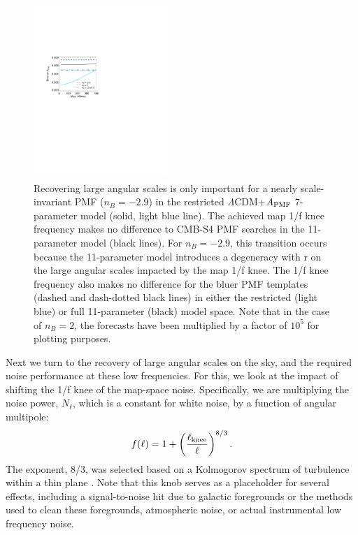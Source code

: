 \documentclass[apj]{emulateapj}
\newcommand{\apmf}{\ensuremath{A_{\rm PMF}}}
\newcommand{\lcdm}{\ensuremath{\Lambda}CDM}
\newcommand{\be}{\begin{equation}}
\newcommand{\ee}{\end{equation}}
\begin{document}
\begin{figure}[htb]\centering
\includegraphics[width=0.45\textwidth,clip,trim={2.cm 12.5cm 11cm 7.5cm}]{pmf_knee.pdf}
  \caption[Map knee dependence]{
  Recovering large angular scales is only important for a nearly scale-invariant PMF ($n_B = -2.9$) in the restricted \lcdm{}+\apmf{} 7-parameter model (solid, light blue line). 
The achieved map 1/f knee frequency makes no difference to CMB-S4 PMF searches in the 11-parameter model (black lines). 
  For $n_B=-2.9$, this transition occurs because the 11-parameter model introduces a degeneracy with r on the large angular scales impacted by the map 1/f knee. 
  The 1/f knee frequency also makes no difference for the bluer PMF templates  (dashed and dash-dotted black lines) in either the restricted (light blue) or full 11-parameter (black) model space. 
     Note that in the case of $n_B=2$, the forecasts have been multiplied by a factor of $10^5$ for plotting purposes. 
    \label{fig:knee}
  }
\end{figure}

Next we turn to the recovery of large angular scales on the sky, and the required noise performance at these low frequencies. 
For this, we look at the impact of shifting the 1/f knee of the map-space noise. 
Specifically, we are multiplying the noise power, $N_\ell$, which is a constant for white noise,  by a function of angular multipole:
\be \label{eqn:knee}
f(\ell) = 1 + \left(\frac{\ell_{\rm knee}}{\ell}\right)^{8/3}.
\ee 
The exponent, 8/3, was selected based on a Kolmogorov spectrum of turbulence within a thin plane \citep{lay00}. %
Note that this knob  serves as a placeholder for several effects, including a signal-to-noise hit due to galactic foregrounds or the methods used to clean these foregrounds, atmospheric noise, or actual instrumental low frequency noise. 
\end{document}

